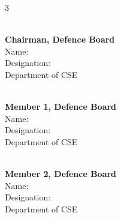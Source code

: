 \documentclass[12pt, a4paper]{report}
\begin{document}
\begin{titlepage}
\vspace{5.2cm}

\begin{multicols}{3}
    \begin{flushleft}
        \hrulefill \\
        {\footnotesize \textbf{Chairman, Defence Board}\\\vspace{1mm}Name:\\
        Designation:\\Department of CSE}
    \end{flushleft}

    \begin{flushleft}
        \hrulefill \\
        {\footnotesize \textbf{Member 1, Defence Board}\\\vspace{1mm}Name:\\
        Designation:\\Department of CSE}
    \end{flushleft}

    \begin{flushleft}
        \hrulefill \\
        {\footnotesize \textbf{Member 2, Defence Board}\\\vspace{1mm}Name:\\
        Designation:\\Department of CSE}
    \end{flushleft}
\end{multicols}

\end{titlepage}

\setcounter{page}{1}
\end{document}
